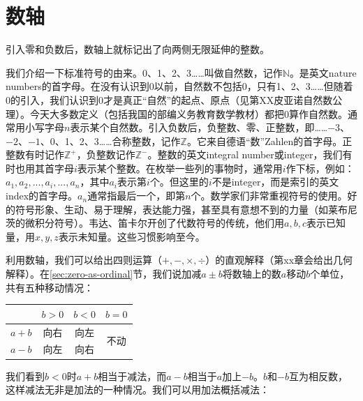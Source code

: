 \documentclass[b5paper]{ctexart}
\begin{document}
\section{数轴}
引入零和负数后，数轴上就标记出了向两侧无限延伸的整数。

\begin{center}
\end{center}

我们介绍一下标准符号的由来。0、1、2、3……叫做自然数，记作$\mathbb{N}$。是英文nature numbers的首字母。在没有认识到0以前，自然数不包括0，只有1、2、3……但随着0的引入，我们认识到0才是真正“自然”的起点、原点（见第XX皮亚诺自然数公理）。今天大多数定义（包括我国的部编义务教育数学教材）都把0算作自然数。通常用小写字母$n$表示某个自然数。引入负数后，负整数、零、正整数，即……$-3$、$-2$、$-1$、0、1、2、3……合称整数，记作$\mathbb{Z}$。它来自德语“数”Zahlen的首字母。正整数有时记作$\mathbb{Z}^+$，负整数记作$\mathbb{Z}^-$。整数的英文integral number或integer，我们有时也用其首字母$i$表示某个整数。在枚举一些列的事物时，通常用$i$作下标，例如：$a_1, a_2, ..., a_i, ..., a_n$，其中$a_i$表示第$i$个。但这里的$i$不是integer，而是索引的英文index的首字母。$a_n$通常指最后一个，即第$n$个。数学家们非常重视符号的使用。好的符号形象、生动、易于理解，表达能力强，甚至具有意想不到的力量（如莱布尼茨的微积分符号）。韦达、笛卡尔开创了代数符号的传统，他们用$a, b, c$表示已知量，用$x, y, z$表示未知量。这些习惯影响至今。

利用数轴，我们可以给出四则运算（$+, -, \times, \div$）的直观解释（第xx章会给出几何解释）。在\ref{sec:zero-as-ordinal}节，我们说加减$a \pm b$将数轴上的数$a$移动$b$个单位，共有五种移动情况：

\begin{center}
  \begin{tabular}{c|c|c|c}
          & $b > 0$ & $b < 0$ & $b = 0$ \\
  \hline
  $a + b$ & 向右     & 向左    & \multirow{2}{*}{不动} \\
  \cline{1-3}
  $a - b$ & 向左     & 向右
  \end{tabular}
\end{center}

我们看到$b < 0$时$a + b$相当于减法，而$a - b$相当于$a$加上$-b$。$b$和$-b$互为相反数，这样减法无非是加法的一种情况。我们可以用加法概括减法：
\end{document}
